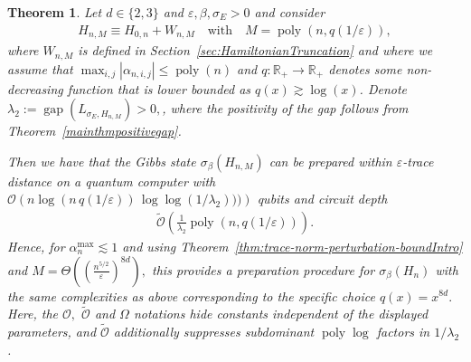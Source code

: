 \documentclass[11pt]{amsart}
\newcommand{\1}{\mathbbm{1}}
\newcommand{\R}{\mathbb{R}}
\newcommand{\eps}{\varepsilon}
\theoremstyle{plain}
\newtheorem{theorem}{Theorem}[section]
\theoremstyle{definition}
\theoremstyle{remark}
\numberwithin{equation}{section}
\begin{document}
\begin{theorem}
\label{thm:GibbsPrepareCoulomb}
Let $d\in\{2,3\}$ and $\eps,\beta,\sigma_E>0$  and consider 
\begin{align*}
H_{n,M}\equiv H_{0,n} + W_{n,M} \quad\text{with}\quad M = \operatorname{poly}(n,q(1/\eps)),
\end{align*} 
where $W_{n,M}$ is defined in Section~\ref{sec:HamiltonianTruncation} and where we assume that $\max_{i,j}|\alpha_{n,i,j}| \le \operatorname{poly}(n)$ and $q:\R_+\to \R_+$ denotes some non-decreasing function that is lower bounded as $q(x)\gtrsim \log(x)$.
Denote $\lambda_2 := \operatorname{gap}(L_{\sigma_E,H_{n,M}})>0,$, where the positivity of the gap follows from Theorem~\ref{mainthmpositivegap}.

Then we have that the Gibbs state $\sigma_\beta(H_{n,M})$ can be prepared within $\eps$-trace distance on a quantum computer with $\mathcal{O}\left(n\log (n\,q(1/\eps))\,\log\log(1/\lambda_2)))\right)$ qubits and circuit depth
\begin{align*}
  \widetilde{ \mathcal{O}}\left(\frac{1}{\lambda_2}\operatorname{poly}\left(n, q(1/\eps)\right)\right).
\end{align*}
Hence, for $\alpha^{\max}_n\lesssim 1$ and using Theorem~\ref{thm:trace-norm-perturbation-boundIntro} and $M = \Theta\left(\left(\frac{n^{5/2}}{\eps}\right)^{8d}\right),$ this provides a preparation procedure for $\sigma_\beta(H_n)$ with the same complexities as above corresponding to the specific choice $q(x) = x^{8d}.$ 
Here, the $\mathcal{O},$ $\widetilde{\mathcal{O}}$ and $\Omega$ notations hide constants independent of the displayed parameters, and $\widetilde{\mathcal{O}}$ additionally suppresses subdominant $\operatorname{poly}\log$ factors in $1/\lambda_2$.
\end{theorem}
\end{document}
